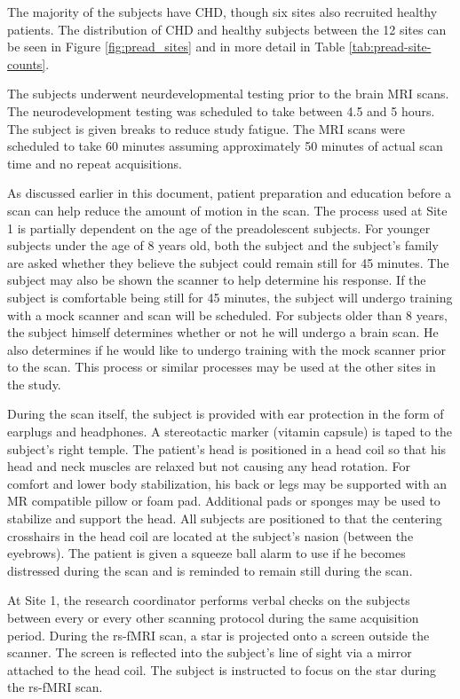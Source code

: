 The majority of the subjects have CHD, though six sites also recruited healthy patients. The distribution of CHD and healthy subjects between the 12 sites can be seen in Figure \ref{fig:pread_sites} and in more detail in Table \ref{tab:pread-site-counts}.

The subjects underwent neurdevelopmental testing prior to the brain MRI scans. The neurodevelopment testing was scheduled to take between 4.5 and 5 hours. The subject is given breaks to reduce study fatigue. The MRI scans were scheduled to take 60 minutes assuming approximately 50 minutes of actual scan time and no repeat acquisitions. 

As discussed earlier in this document, patient preparation and education before a scan can help reduce the amount of motion in the scan. The process used at Site 1 is partially dependent on the age of the preadolescent subjects. For younger subjects under the age of 8 years old, both the subject and the subject's family are asked whether they believe the subject could remain still for 45 minutes. The subject may also be shown the scanner to help determine his response. If the subject is comfortable being still for 45 minutes, the subject will undergo training with a mock scanner and scan will be scheduled. For subjects older than 8 years, the subject himself determines whether or not he will undergo a brain scan. He also determines if he would like to undergo training with the mock scanner prior to the scan. This process or similar processes may be used at the other sites in the study.

During the scan itself, the subject is provided with ear protection in the form of earplugs and headphones. A stereotactic marker (vitamin capsule) is taped to the subject's right temple. The patient's head is positioned in a head coil so that his head and neck muscles are relaxed but not causing any head rotation. For comfort and lower body stabilization, his back or legs may be supported with an MR compatible pillow or foam pad. Additional pads or sponges may be used to stabilize and support the head. All subjects are positioned to that the centering crosshairs in the head coil are located at the subject's nasion (between the eyebrows). The patient is given a squeeze ball alarm to use if he becomes distressed during the scan and is reminded to remain still during the scan. 

At Site 1, the research coordinator performs verbal checks on the subjects between every or every other scanning protocol during the same acquisition period. During the rs-fMRI scan, a star is projected onto a screen outside the scanner. The screen is reflected into the subject's line of sight via a mirror attached to the head coil. The subject is instructed to focus on the star during the rs-fMRI scan.

